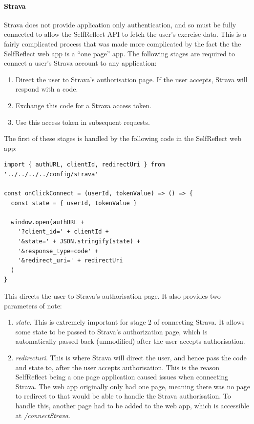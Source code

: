\documentclass[11pt,openright,a4paper]{report}
\begin{document}
\paragraph{Strava} Strava does not provide application only authentication, and so must be fully connected to allow the SelfReflect API to fetch the user's exercise data. This is a fairly complicated process that was made more complicated by the fact the the SelfReflect web app is a \enquote{one page} app. The following stages are required to connect a user's Strava account to any application:
\begin{enumerate}
\item Direct the user to Strava's authorisation page. If the user accepts, Strava will respond with a code.
\item Exchange this code for a Strava access token.
\item Use this access token in subsequent requests.
\end{enumerate}

\newpage
The first of these stages is handled by the following code in the SelfReflect web app:
\begin{lstlisting}
import { authURL, clientId, redirectUri } from '../../../../config/strava'

const onClickConnect = (userId, tokenValue) => () => {
  const state = { userId, tokenValue }

  window.open(authURL +
    '?client_id=' + clientId +
    '&state=' + JSON.stringify(state) +
    '&response_type=code' +
    '&redirect_uri=' + redirectUri
  )
}
\end{lstlisting}

This directs the user to Strava's authorisation page. It also provides two parameters of note:
\begin{enumerate}
\item \emph{state}. This is extremely important for stage 2 of connecting Strava. It allows some state to be passed to Strava's authorization page, which is automatically passed back (unmodified) after the user accepts authorisation.
\item \emph{redirect\textunderscore uri}. This is where Strava will direct the user, and hence pass the code and state to, after the user accepts authorisation. This is the reason SelfReflect being a one page application caused issues when connecting Strava. The web app originally only had one page, meaning there was no page to redirect to that would be able to handle the Strava authorisation. To handle this, another page had to be added to the web app, which is accessible at \emph{/connectStrava}.
\end{enumerate}
\end{document}
